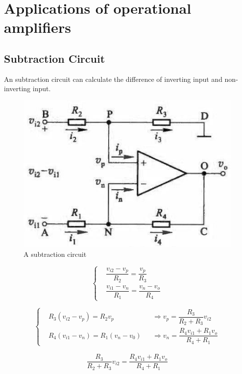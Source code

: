 \section{Applications of operational amplifiers}

\subsection{Subtraction Circuit}

An subtraction circuit can calculate the difference of inverting input and non-inverting input.

\begin{figure}[H]
  \centering
  \includegraphics[width=0.5\linewidth]{figures/subtraction-amplifier}
  \caption{A subtraction circuit}
\end{figure}

\begin{equation*}
  \left\{
    \begin{aligned}
      & \dfrac{v_{i2} - v_p}{R_2} = \dfrac{v_p}{R_3} \\
      & \dfrac{v_{i1} - v_n}{R_1} = \dfrac{v_n - v_o}{R_4}  
    \end{aligned}
  \right.
\end{equation*}

\begin{equation*}
  \left\{
  \begin{aligned}
    & R_3 \left( v_{i2} - v_p \right) = R_2 v_p && \Rightarrow v_p = \dfrac{R_3}{R_2 + R_3} v_{i2} \\
    & R_4 \left( v_{i1} - v_n \right) = R_1 \left( v_n - v_0 \right) && \Rightarrow v_n = \dfrac{R_4 v_{i1} + R_1 v_o}{R_4 + R_1}
  \end{aligned}
  \right.
\end{equation*}

\begin{equation*}
  \begin{aligned}
    \dfrac{R_3}{R_2 + R_3} v_{i2} = \dfrac{R_4 v_{i1} + R_1 v_o}{R_4 + R_1}
  \end{aligned}
\end{equation*}

